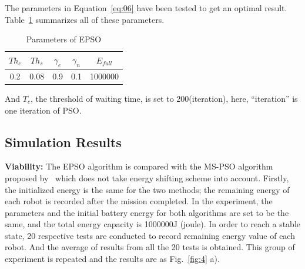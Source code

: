 \documentclass[journal]{IEEEtran}
\begin{document}
The parameters in Equation~\ref{eq:06} have been tested to get an optimal result. Table~\ref{tab:2} summarizes all of these parameters.
\begin{table}[!t]
\renewcommand{\arraystretch}{1.3}
\caption{Parameters of EPSO}
\label{tab:2}
\centering
\begin{tabular}{|c||c||c||c||c|}
\hline
$Th_c$ & $Th_s$ & $\gamma_e$ & $\gamma_n$ & $E_{full}$ \\
\hline
0.2 & 0.08 & 0.9 & 0.1 & 1000000 \\
\hline
\end{tabular}
\end{table}
%
And $T_c$, the threshold of waiting time, is set to 200(iteration), here,  ``iteration'' is one iteration of PSO. 
\subsection{Simulation Results}
\label{subsec:2}
\textbf{Viability:} The EPSO algorithm is compared with the MS-PSO algorithm proposed by~\cite{Meng} which does not take energy shifting scheme into account. Firstly, the initialized energy is the same for the two methods; the remaining energy of each robot is recorded after the mission completed. In the experiment, the parameters and the initial battery energy for both algorithms are set to be the same, and the total energy capacity is 1000000J (joule). In order to reach a stable state, 20 respective tests are conducted to record remaining energy value of each robot. And the average of results from all the 20 tests is obtained. This group of experiment is repeated and the results are as Fig.~\ref{fig:4} a).
%
\end{document}
